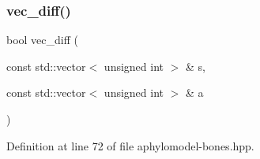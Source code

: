 \subsubsection{\texorpdfstring{vec\+\_\+diff()}{vec\_diff()}}
{\footnotesize\ttfamily bool vec\+\_\+diff (\begin{DoxyParamCaption}\item[{const std\+::vector$<$ unsigned int $>$ \&}]{s,  }\item[{const std\+::vector$<$ unsigned int $>$ \&}]{a }\end{DoxyParamCaption})\hspace{0.3cm}{\ttfamily [inline]}}



Definition at line 72 of file aphylomodel-\/bones.\+hpp.

